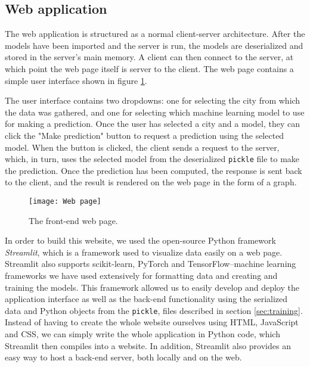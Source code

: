\subsection{Web application}\label{sec:web app}
The web application is structured as a normal client-server architecture. After the models have been imported and the server is run, the models are deserialized and stored in the server's main memory.
A client can then connect to the server, at which point the web page itself is server to the client.
The web page contains a simple user interface shown in figure \ref{fig:web page}.

The user interface contains two dropdowns: one for selecting the city from which the data was gathered, and one for selecting which machine learning model to use for making a prediction.
Once the user has selected a city and a model, they can click the "Make prediction" button to request a prediction using the selected model.
When the button is clicked, the client sends a request to the server, which, in turn, uses the selected model from the deserialized \texttt{pickle} file to make the prediction. 
Once the prediction has been computed, the response is sent back to the client, and the result is rendered on the web page in the form of a graph.

\begin{figure}[t]
	\centering
	\texttt{[image: Web page]}
	\caption{The front-end web page.}
	\label{fig:web page}
\end{figure}

In order to build this website, we used the open-source Python framework \textit{Streamlit}\cite{streamlit}, which is a framework used to visualize data easily on a web page.
Streamlit also supports scikit-learn\cite{scikit-learn}, PyTorch\cite{pytorch} and TensorFlow\cite{tensorflow}--machine learning frameworks we have used extensively for formatting data and creating and training the models.
This framework allowed us to easily develop and deploy the application interface as well as the back-end functionality using the serialized data and Python objects from the \texttt{pickle}, files described in section \ref{sec:training}.
Instead of having to create the whole website ourselves using HTML, JavaScript and CSS, we can simply write the whole application in Python code, which Streamlit then compiles into a website.
In addition, Streamlit also provides an easy way to host a back-end server, both locally and on the web.

